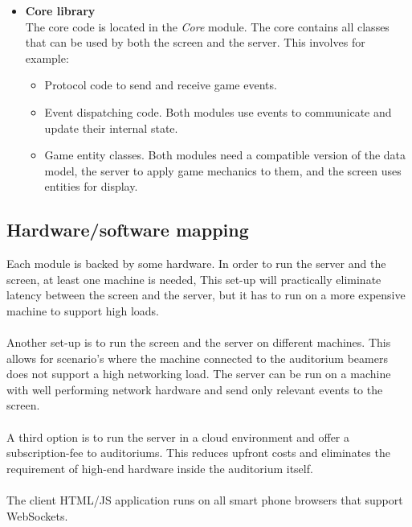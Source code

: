 \documentclass[11pt,a4paper]{article}
\begin{document}
\begin{itemize}
\item \textbf{Core library} \\
The core code is located in the \emph{Core} module. The core contains all classes that can be used by both the screen and the server. This involves for example:
\begin{itemize}
\item Protocol code to send and receive game events.
\item Event dispatching code. Both modules use events to communicate and update their internal state.
\item Game entity classes. Both modules need a compatible version of the data model, the server to apply game mechanics to them, and the screen uses entities for display.
\end{itemize}

\end{itemize}

\subsection{Hardware/software mapping}
Each module is backed by some hardware. In order to run the server and the screen, at least one machine is needed, This set-up will practically eliminate latency between the screen and the server, but it has to run on a more expensive machine to support high loads.\\
\\
Another set-up is to run the screen and the server on different machines. This allows for scenario's where the machine connected to the auditorium beamers does not support a high networking load. The server can be run on a machine with well performing network hardware and send only relevant events to the screen.\\
\\
A third option is to run the server in a cloud environment and offer a subscription-fee to auditoriums. This reduces upfront costs and eliminates the requirement of high-end hardware inside the auditorium itself.\\
\\
The client HTML/JS application runs on all smart phone browsers that support WebSockets. 
\end{document}
